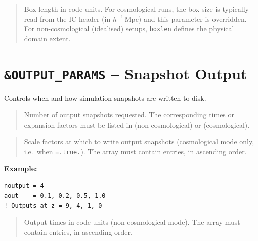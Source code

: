 \label{param:boxlen}

\begin{quote}
Box length in code units.  For cosmological runs, the box size is
typically read from the IC header (in $h^{-1}\,$Mpc) and this
parameter is overridden.  For non-cosmological (idealised) setups,
\texttt{boxlen} defines the physical domain extent.
\end{quote}


\section{\texttt{\&OUTPUT\_PARAMS} -- Snapshot Output}
\label{sec:output_params}

Controls when and how simulation snapshots are written to disk.

\label{param:noutput}

\begin{quote}
Number of output snapshots requested.  The corresponding times or
expansion factors must be listed in  (non-cosmological)
or  (cosmological).
\end{quote}

\label{param:aout}

\begin{quote}
Scale factors at which to write output snapshots (cosmological mode
only, i.e.\ when \texttt{=.true.}).  The array must
contain  entries, in ascending order.
\end{quote}

\noindent\textcolor{apidefault}{\textsf{\textbf{Example:}}}
\begin{lstlisting}
noutput = 4
aout    = 0.1, 0.2, 0.5, 1.0
! Outputs at z = 9, 4, 1, 0
\end{lstlisting}

\label{param:tout}

\begin{quote}
Output times in code units (non-cosmological mode).  The array must
contain  entries, in ascending order.
\end{quote}

